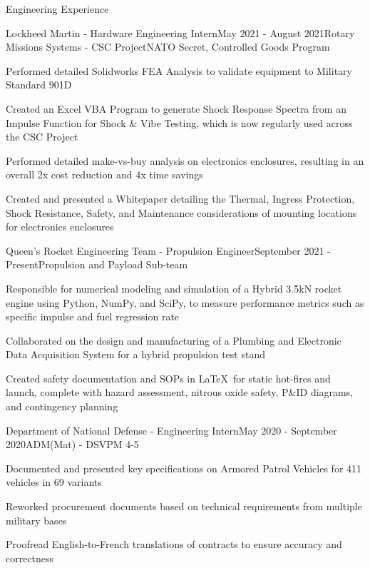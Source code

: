 \documentclass{resume} %
\begin{document}
\begin{rSection}{Engineering Experience}

\begin{rSubsection}{Lockheed Martin - Hardware Engineering Intern}{May 2021 - August 2021}{Rotary Missions Systems - CSC Project}{NATO Secret, Controlled Goods Program}

\item Performed detailed Solidworks FEA Analysis to validate equipment to Military Standard 901D
\item Created an Excel VBA Program to generate Shock Response Spectra from an Impulse Function for Shock \& Vibe Testing, which is now regularly used across the CSC Project
\item Performed detailed make-vs-buy analysis on electronics enclosures, resulting in an overall 2x cost reduction and 4x time savings
\item Created and presented a Whitepaper detailing the Thermal, Ingress Protection, Shock Resistance, Safety, and Maintenance considerations of mounting locations for electronics enclosures

\end{rSubsection}

\begin{rSubsection}{Queen's Rocket Engineering Team - Propulsion Engineer}{September 2021 - Present}{Propulsion and Payload Sub-team}{}

\item Responsible for numerical modeling and simulation of a Hybrid 3.5kN rocket engine using Python, NumPy, and SciPy, to measure performance metrics such as specific impulse and fuel regression rate
\item Collaborated on the design and manufacturing of a Plumbing and Electronic Data Acquisition System for a hybrid propulsion test stand
\item Created safety documentation and SOPs in \LaTeX\ for static hot-fires and launch, complete with hazard assessment, nitrous oxide safety, P\&ID diagrams, and contingency planning

\end{rSubsection}

\begin{rSubsection}{Department of National Defense - Engineering Intern}{May 2020 - September 2020}{ADM(Mat) - DSVPM 4-5}{}

\item Documented and presented key specifications on Armored Patrol Vehicles for 411 vehicles in 69 variants
\item Reworked procurement documents based on technical requirements from multiple military bases
\item Proofread English-to-French translations of contracts to ensure accuracy and correctness

\end{rSubsection}


\end{rSection}
\end{document}
